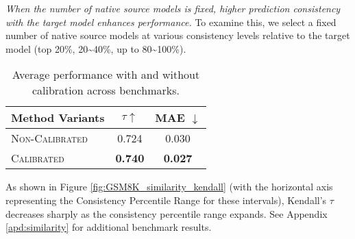 \textit{When the number of native source models is fixed, higher prediction consistency with the target model enhances performance.} To examine this, we select a fixed number of native source models at various consistency levels relative to the target model (top 20\%, 20\textasciitilde 40\%, up to 80\textasciitilde 100\%). 
\begin{table}[htbp]
\renewcommand\arraystretch{1}
\centering
\setlength{\tabcolsep}{1em} 
\begin{tabular}{l cc}
\toprule
\textbf{Method Variants}& \textbf{$\tau \uparrow$} & {\scriptsize \textbf{MAE} $\downarrow$}  \\ 
\midrule
\textsc{Non-Calibrated}    & 0.724 & 0.030 \\
\textsc{Calibrated}         & \textbf{0.740} & \textbf{0.027}  \\
\bottomrule
\end{tabular}
\caption{Average performance with and without calibration across benchmarks.}
\label{tab:calibrate}
\vspace{-0.5cm}
\end{table}
As shown in Figure \ref{fig:GSM8K_similarity_kendall} (with the horizontal axis representing the Consistency Percentile Range for these intervals), Kendall’s $\tau$ decreases sharply as the consistency percentile range expands. See Appendix \ref{apd:similarity} for additional benchmark results.




